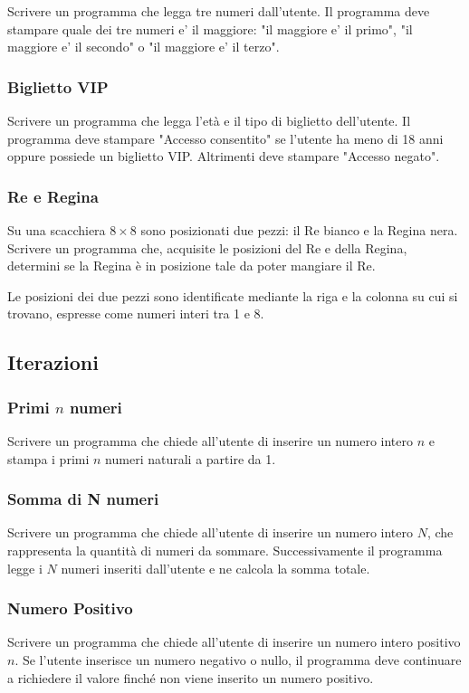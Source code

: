 \documentclass[a4paper,12pt]{article}
\begin{document}
	Scrivere un programma che legga tre numeri dall'utente. 
	Il programma deve stampare quale dei tre numeri e' il maggiore: "il maggiore e' il primo", "il maggiore e' il secondo" o "il maggiore e' il terzo".
	
	
	\subsubsection{Biglietto VIP}
	
	Scrivere un programma che legga l'età e il tipo di biglietto dell'utente. 
	Il programma deve stampare "Accesso consentito" se l'utente ha meno di 18 anni oppure possiede un biglietto VIP. 
	Altrimenti deve stampare "Accesso negato".
	
	
	\subsubsection{Re e Regina}
	
	Su una scacchiera $8 \times 8$ sono posizionati due pezzi: il Re bianco e la Regina nera.  
	Scrivere un programma che, acquisite le posizioni del Re e della Regina, determini se la Regina è in posizione tale da poter mangiare il Re.  
	
	Le posizioni dei due pezzi sono identificate mediante la riga e la colonna su cui si trovano, espresse come numeri interi tra 1 e 8.
	
	
	
	\subsection{Iterazioni}
	
	\subsubsection{Primi $n$ numeri}
	Scrivere un programma che chiede all'utente di inserire un numero intero $n$ e stampa i primi $n$ numeri naturali a partire da 1.
	
	
	\subsubsection{Somma di N numeri}
	Scrivere un programma che chiede all'utente di inserire un numero intero $N$, che rappresenta la quantità di numeri da sommare. Successivamente il programma legge i $N$ numeri inseriti dall'utente e ne calcola la somma totale.
	
	\subsubsection{Numero Positivo}
	Scrivere un programma che chiede all'utente di inserire un numero intero positivo $n$. Se l'utente inserisce un numero negativo o nullo, il programma deve continuare a richiedere il valore finché non viene inserito un numero positivo.
	
\end{document}
